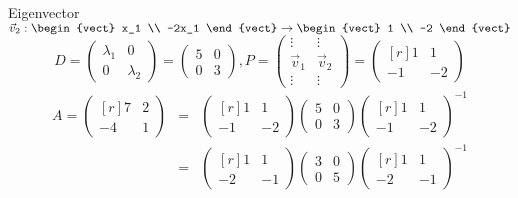 Eigenvector $\vec{v}_2: \begin{vect} x_1 \\ -2x_1 \end{vect} \to \begin{vect} 1 \\ -2 \end{vect}$
\[ D = \begin{pmatrix} \lambda_1 & 0 \\ 0 & \lambda_2 \end{pmatrix} = \begin{pmatrix} 5 & 0 \\ 0 & 3 \end{pmatrix}, P = \begin{pmatrix} \vdots & \vdots \\ \vec{v}_1 & \vec{v}_2 \\ \vdots & \vdots \end{pmatrix} = \begin{pmatrix*}[r] 1 & 1 \\ -1 & -2 \end{pmatrix*} \]
\begin{eqnarray*}
	A = \begin{pmatrix*}[r] 7 & 2 \\ -4 & 1 \end{pmatrix*} &=& \begin{pmatrix*}[r] 1 & 1 \\ -1 & -2 \end{pmatrix*} \begin{pmatrix} 5 & 0 \\ 0 & 3 \end{pmatrix} \begin{pmatrix*}[r] 1 & 1 \\ -1 & -2 \end{pmatrix*}^{-1} \\
	&=& \begin{pmatrix*}[r] 1 & 1 \\ -2 & -1 \end{pmatrix*} \begin{pmatrix} 3 & 0 \\ 0 & 5 \end{pmatrix} \begin{pmatrix*}[r] 1 & 1 \\ -2 & -1 \end{pmatrix*}^{-1}
\end{eqnarray*}

